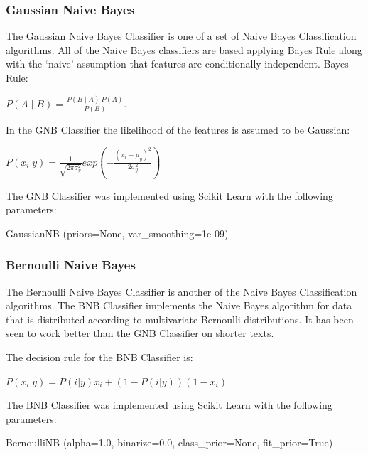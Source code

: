 \subsubsection*{Gaussian Naive Bayes}

The Gaussian Naive Bayes Classifier is one of a set of Naive Bayes Classification algorithms. All of the Naive Bayes classifiers are based applying Bayes Rule along with the ‘naive’ assumption that features are conditionally independent. Bayes Rule: 
\begin{center}
\(P(A\mid B)=\frac{P(B\mid A)\:P(A)}{P(B)}\). 
\end{center}
In the GNB Classifier the likelihood of the features is assumed to be Gaussian:
\begin{center}
$P(x_i|y) = \frac{1}{\sqrt{2\pi\sigma_y^2}} exp (- \frac{(x_i - \mu_y)^2}{2\sigma_y^2})$
\end{center}
The GNB Classifier was implemented using Scikit Learn with the following parameters:

\begin{tcolorbox}
\begin{center}
	GaussianNB (priors=None, var\_smoothing=1e-09)
\end{center}
\end{tcolorbox}

\subsubsection*{Bernoulli Naive Bayes}

The Bernoulli Naive Bayes Classifier is another of the Naive Bayes Classification algorithms. The BNB Classifier implements the Naive Bayes algorithm for data that is distributed according to multivariate Bernoulli distributions. It has been seen to work better than the GNB Classifier on shorter texts.

The decision rule for the BNB Classifier is:
\begin{center}
$P(x_i|y) = P(i|y)x_i + (1 - P(i|y))(1 - x_i)$
\end{center}

The BNB Classifier was implemented using Scikit Learn with the following parameters:

\begin{tcolorbox}
\begin{center}
	BernoulliNB (alpha=1.0, binarize=0.0, class\_prior=None, fit\_prior=True)
\end{center}
\end{tcolorbox}

